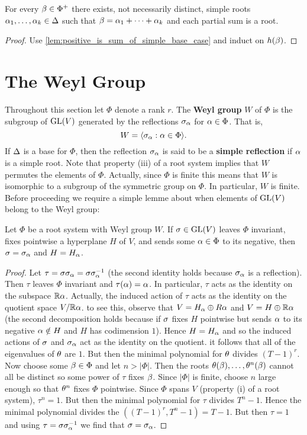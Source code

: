 \documentclass[12pt,reqno,oneside]{amsart}
\begin{document}
    \begin{corollary}
        For every $\beta \in \Phi^{+}$ there exists, not necessarily distinct, simple roots $\alpha_{1},\ldots,\alpha_{k} \in \Delta$ such that $\beta = \alpha_{1}+\cdots+\alpha_{k}$ and each partial sum is a root.
    \end{corollary}
    \begin{proof}
        Use \cref{lem:positive_is_sum_of_simple_base_case} and induct on $h(\beta)$. 
    \end{proof}
\section{The Weyl Group}
    Throughout this section let $\Phi$ denote a rank $r$. The \textbf{Weyl group} $W$ of $\Phi$ is the subgroup of $\mathrm{GL}(V)$ generated by the reflections $\sigma_{\alpha}$ for $\alpha \in \Phi$. That is,
    \[
        W = \langle\sigma_{\alpha}:\alpha \in \Phi\rangle.
    \]
    If $\Delta$ is a base for $\Phi$, then the reflection $\sigma_{\alpha}$ is said to be a \textbf{simple reflection} if $\alpha$ is a simple root. Note that property (iii) of a root system implies that $W$ permutes the elements of $\Phi$. Actually, since $\Phi$ is finite this means that $W$ is isomorphic to a subgroup of the symmetric group on $\Phi$. In particular, $W$ is finite. Before proceeding we require a simple lemme about when elements of $\mathrm{GL}(V)$ belong to the Weyl group:

    \begin{lemma}\label{lem:when_linear_transform_is_a_Weyl_group_element}
        Let $\Phi$ be a root system with Weyl group $W$. If $\sigma \in \mathrm{GL}(V)$ leaves $\Phi$ invariant, fixes pointwise a hyperplane $H$ of $V$, and sends some $\alpha \in \Phi$ to its negative, then $\sigma = \sigma_{\alpha}$ and $H = H_{\alpha}$. 
    \end{lemma}
    \begin{proof}
        Let $\tau = \sigma\sigma_{\alpha} = \sigma\sigma_{\alpha}^{-1}$ (the second identity holds because $\sigma_{\alpha}$ is a reflection). Then $\tau$ leaves $\Phi$ invariant and $\tau(\alpha) = \alpha$. In particular, $\tau$ acts as the identity on the subspace $\mathbb{R}\alpha$. Actually, the induced action of $\tau$ acts as the identity on the quotient space $V/\mathbb{R}\alpha$. to see this, observe that $V = H_{\alpha} \oplus R\alpha$ and $V = H \oplus \mathbb{R}\alpha$ (the second decomposition holds because if $\sigma$ fixes $H$ pointwise but sends $\alpha$ to its negative $\alpha \notin H$ and $H$ has codimension $1$). Hence $H = H_{\alpha}$ and so the induced actions of $\sigma$ and $\sigma_{\alpha}$ act as the identity on the quotient. it follows that all of the eigenvalues of $\theta$ are $1$. But then the minimal polynomial for $\theta$ divides $(T-1)^{r}$. Now choose some $\beta \in \Phi$ and let $n > |\Phi|$. Then the roots $\theta(\beta),\ldots,\theta^{n}(\beta)$ cannot all be distinct so some power of $\tau$ fixes $\beta$. Since $|\Phi|$ is finite, choose $n$ large enough so that $\theta^{n}$ fixes $\Phi$ pointwise. Since $\Phi$ spans $V$ (property (i) of a root system), $\tau^{n} = 1$. But then the minimal polynomial for $\tau$ divides $T^{n}-1$. Hence the minimal polynomial divides the $((T-1)^{r},T^{n}-1) = T-1$. But then $\tau = 1$ and using $\tau = \sigma\sigma_{\alpha}^{-1}$ we find that $\sigma = \sigma_{\alpha}$.
    \end{proof}
\end{document}
